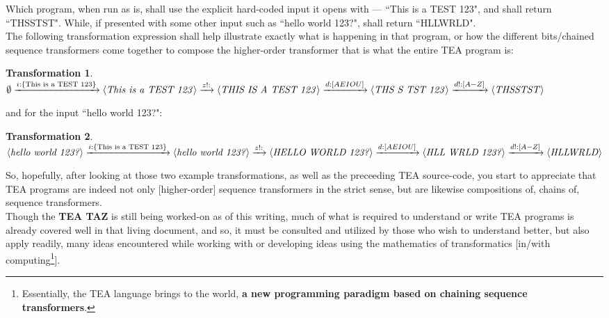 \documentclass[a4paper, 18pt]{book} %
\newtheorem{trans}{Transformation}
\begin{document}
 Which program, when run as is, shall use the explicit hard-coded input it opens with --- ``This is a TEST 123", and shall return ``THSSTST". While, if presented with some other input such as ``hello world 123?", shall return ``HLLWRLD".\\
 
The following transformation expression shall help illustrate exactly what is happening in that program, or how the different bits/chained sequence transformers come together to compose the higher-order transformer that is what the entire TEA program is:
 
 \vspace{1em}
\begin{trans}
$\emptyset \xrightarrow{i:\{\text{This is a TEST 123}\}} \langle \text{\textit{This is a TEST 123}} \rangle \xrightarrow{z!:} \langle \text{\textit{THIS IS A TEST 123}} \rangle \xrightarrow{d:[AEIOU]} \langle \text{\textit{THS S  TST 123}} \rangle \xrightarrow{d!:[A-Z]} \langle \text{\textit{THSSTST}} \rangle$\\
\end{trans} 
\vspace{1em}
 
 
 and for the input ``hello world 123?":
 
 \vspace{1em}
 \begin{trans}
 \label{TRANSTEAPROGb}
$\langle \text{\textit{hello world 123?}} \rangle \xrightarrow{i:\{\text{This is a TEST 123}\}} \langle \text{\textit{hello world 123?}} \rangle \xrightarrow{z!:} \langle \text{\textit{HELLO WORLD 123?}} \rangle \xrightarrow{d:[AEIOU]} \langle \text{\textit{HLL WRLD 123?}} \rangle \xrightarrow{d!:[A-Z]} \langle \text{\textit{HLLWRLD}} \rangle$
\end{trans} 
\vspace{1em}
 
 So, hopefully, after looking at those two example transformations, as well as the preceeding TEA source-code, you start to appreciate that TEA programs are indeed not only [higher-order] sequence transformers in the strict sense, but are likewise compositions of, chains of, sequence transformers.\\
 
 Though the \textbf{TEA TAZ}\cite{Lutalo2024TEATAZ} is still being worked-on as of this writing, much of what is required to understand or write TEA programs is already covered well in that living document, and so, it must be consulted and utilized by those who wish to understand better, but also apply readily, many ideas encountered while working with or developing ideas using the mathematics of transformatics [in/with computing\footnote{Essentially, the TEA language brings to the world, \textbf{a new programming paradigm based on chaining sequence transformers}.}].
\end{document}
